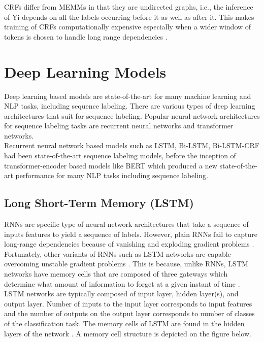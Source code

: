 \ac{CRF}s differ from \ac{MEMM}s in that they are undirected graphs, i.e., the inference of Yi depends on all the labels occurring before it as well as after it. This makes training of CRFs computationally expensive especially when a wider window of tokens is chosen to handle long range dependencies \citep{aggarwal2018machine}. 

\section{Deep Learning Models }
\label{sec:chapter05:MLModels:DLMs}

Deep learning based models are state-of-the-art for many machine learning and \ac{NLP} tasks, including sequence labeling. There are various types of deep learning architectures that suit for sequence labeling. Popular neural network architectures for sequence labeling tasks are recurrent neural networks and  transformer networks. \\

 
Recurrent neural network based models such as \ac{LSTM}, \ac{Bi-LSTM}, \ac{Bi-LSTM-CRF} had been state-of-the-art sequence labeling models, before the inception of transformer-encoder based models like BERT which produced a new state-of-the-art performance for many \ac{NLP} tasks including sequence labeling. 


\subsection{Long Short-Term Memory (\ac{LSTM})}
\label{sec:chapter05:DLModels:LSTM}


\ac{RNN}s are specific type of neural network architectures that take a sequence of inputs features to  yield a sequence of labels. However, plain RNNs fail to capture long-range dependencies because of vanishing and exploding gradient problems \citep{pascanu2013difficulty, fischer2018deep}. \\

Fortunately, other variants of RNNs such as LSTM networks are capable overcoming unstable gradient problems \citep{akhundov2018sequence, lample2016neural, ma2016end}. This is because, unlike RNNs, LSTM networks have memory cells that are composed of three gateways which determine what amount of information to forget at a given instant of time \citep{ma2016end}. \\

LSTM networks are typically composed of input layer, hidden layer(s), and output layer. Number of inputs to the input layer corresponds to input features and the number of outputs on the output layer corresponds to number of classes of the classification task. The memory cells of LSTM are found in the hidden layers of the network \citep{fischer2018deep}. A memory cell structure is depicted on the figure below. 


